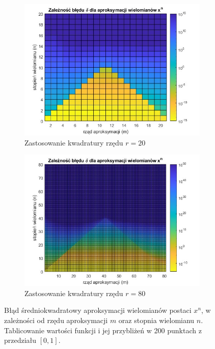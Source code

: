 \documentclass[a4paper,12pt]{article}
\begin{document}
\begin{figure}[H]
\centering
\begin{subfigure}{.5\textwidth}
  \centering
  \includegraphics[width=1.05\linewidth]{figure1.jpg}
  \caption{Zastosowanie kwadratury rzędu $r = 20$}
  \label{fig:sub1}
\end{subfigure}%
\begin{subfigure}{.5\textwidth}
  \centering
  \includegraphics[width=1.05\linewidth]{figure2.jpg}
  \caption{Zastosowanie kwadratury rzędu $r = 80$}
  \label{fig:sub2}
\end{subfigure}
\caption{Błąd średniokwadratowy aproksymacji wielomianów postaci $x^n$, w zależności od rzędu aproksymacji $m$ oraz stopnia wielomianu $n$. Tablicowanie wartości funkcji i jej przybliżeń w 200 punktach z przedziału $[0,1].$}
\label{fig:test}
\end{figure}
\end{document}
